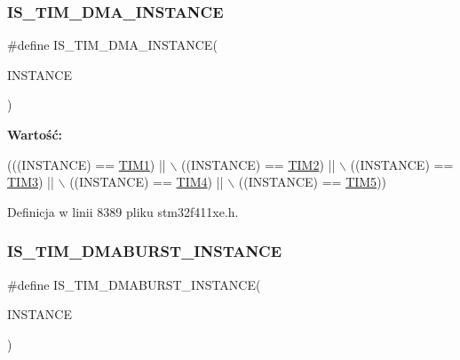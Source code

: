 \subsubsection{\texorpdfstring{I\+S\+\_\+\+T\+I\+M\+\_\+\+D\+M\+A\+\_\+\+I\+N\+S\+T\+A\+N\+CE}{IS\_TIM\_DMA\_INSTANCE}}
{\footnotesize\ttfamily \#define I\+S\+\_\+\+T\+I\+M\+\_\+\+D\+M\+A\+\_\+\+I\+N\+S\+T\+A\+N\+CE(\begin{DoxyParamCaption}\item[{}]{I\+N\+S\+T\+A\+N\+CE }\end{DoxyParamCaption})}

{\bfseries Wartość\+:}
\begin{DoxyCode}
(((INSTANCE) == \hyperlink{group___peripheral__declaration_ga2e87451fea8dc9380056d3cfc5ed81fb}{TIM1}) || \(\backslash\)
                                       ((INSTANCE) == \hyperlink{group___peripheral__declaration_ga3cfac9f2e43673f790f8668d48b4b92b}{TIM2}) || \(\backslash\)
                                       ((INSTANCE) == \hyperlink{group___peripheral__declaration_ga61ee4c391385607d7af432b63905fcc9}{TIM3}) || \(\backslash\)
                                       ((INSTANCE) == \hyperlink{group___peripheral__declaration_ga91a09bad8bdc7a1cb3d85cf49c94c8ec}{TIM4}) || \(\backslash\)
                                       ((INSTANCE) == \hyperlink{group___peripheral__declaration_ga5125ff6a23a2ed66e2e19bd196128c14}{TIM5}))
\end{DoxyCode}


Definicja w linii 8389 pliku stm32f411xe.\+h.

\mbox{\label{group___exported__macros_ga1ed43d4e9823446a1b9d43afc452f42e}} 
\subsubsection{\texorpdfstring{I\+S\+\_\+\+T\+I\+M\+\_\+\+D\+M\+A\+B\+U\+R\+S\+T\+\_\+\+I\+N\+S\+T\+A\+N\+CE}{IS\_TIM\_DMABURST\_INSTANCE}}
{\footnotesize\ttfamily \#define I\+S\+\_\+\+T\+I\+M\+\_\+\+D\+M\+A\+B\+U\+R\+S\+T\+\_\+\+I\+N\+S\+T\+A\+N\+CE(\begin{DoxyParamCaption}\item[{}]{I\+N\+S\+T\+A\+N\+CE }\end{DoxyParamCaption})}

